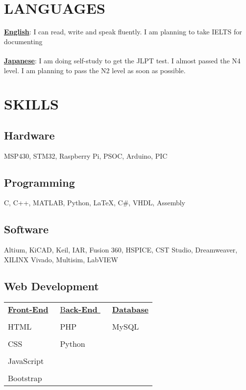 \documentclass[10pt]{article}
\begin{document}
\section{LANGUAGES}
\underline{\bfseries{English}}:   I can read, write and speak fluently. I am planning to take IELTS for documenting \\ \\
\underline{\bfseries{Japanese}}:    I am doing self-study to get the JLPT test. I almost passed the N4 level. I am planning to pass the N2 level as soon as possible.
\newpage
\vspace{2em}
\section{SKILLS}
\vspace{1em}
\subsection{Hardware}
\vspace{1em}
MSP430, STM32, Raspberry Pi, PSOC, Arduino, PIC
\vspace{1em}
\subsection{Programming}
\vspace{1em}
C, C++, MATLAB, Python,  {\LaTeX}, C\#,  VHDL, Assembly
\vspace{1em}
\subsection{Software}
\vspace{1em}
Altium, KiCAD, Keil, IAR, Fusion 360, HSPICE, CST Studio, Dreamweaver, XILINX Vivado, Multisim, LabVIEW
\vspace{1em}
\subsection{Web Development}

\begin{table}[h!]


\begin{center}
\begin{tabular}{p{10em} p{10em} p{10em} } 

 \underline{\bfseries{Front-End}}~ & \underline{B\bfseries{ack-End }}  ~ & \underline{\bfseries{Database }}  \\              
 & & \\
 HTML & PHP & MySQL  \\ 
 & & \\
 CSS& Python & \\ 
 & & \\
 JavaScript & & \\ 
 & & \\
 Bootstrap \\
  


\end{tabular}
\end{center}
\end{table}
\end{document}
